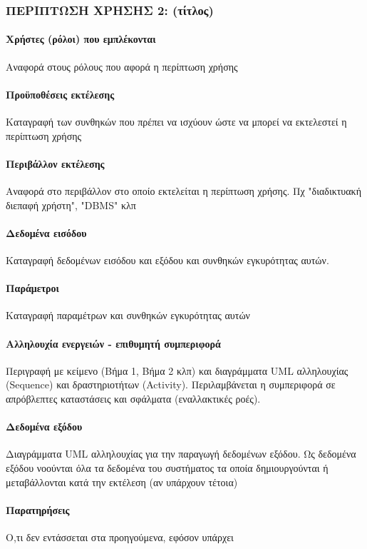 \subsubsection{ΠΕΡΙΠΤΩΣΗ ΧΡΗΣΗΣ 2: (τίτλος)}
\paragraph{Χρήστες (ρόλοι) που εμπλέκονται}
Αναφορά στους ρόλους που αφορά η περίπτωση χρήσης
\paragraph{Προϋποθέσεις εκτέλεσης}
Καταγραφή των συνθηκών που πρέπει να ισχύουν ώστε να μπορεί να εκτελεστεί η περίπτωση χρήσης
\paragraph{Περιβάλλον εκτέλεσης}
Αναφορά στο περιβάλλον στο οποίο εκτελείται η περίπτωση χρήσης. Πχ "διαδικτυακή διεπαφή χρήστη",
"DBMS" κλπ
\paragraph{Δεδομένα εισόδου}
Καταγραφή δεδομένων εισόδου και εξόδου και συνθηκών εγκυρότητας αυτών.
\paragraph{Παράμετροι}
Καταγραφή παραμέτρων και συνθηκών εγκυρότητας αυτών
\paragraph{Αλληλουχία ενεργειών - επιθυμητή συμπεριφορά}
Περιγραφή με κείμενο (Βήμα 1, Βήμα 2 κλπ) και διαγράμματα UML αλληλουχίας (Sequence) και
δραστηριοτήτων (Activity). Περιλαμβάνεται η συμπεριφορά σε απρόβλεπτες καταστάσεις και σφάλματα
(εναλλακτικές ροές).
\paragraph{Δεδομένα εξόδου}
Διαγράμματα UML αλληλουχίας για την παραγωγή δεδομένων εξόδου. Ως δεδομένα εξόδου νοούνται όλα τα
δεδομένα του συστήματος τα οποία δημιουργούνται ή μεταβάλλονται κατά την εκτέλεση (αν υπάρχουν
τέτοια)
\paragraph{Παρατηρήσεις}
Ο,τι δεν εντάσσεται στα προηγούμενα, εφόσον υπάρχει
